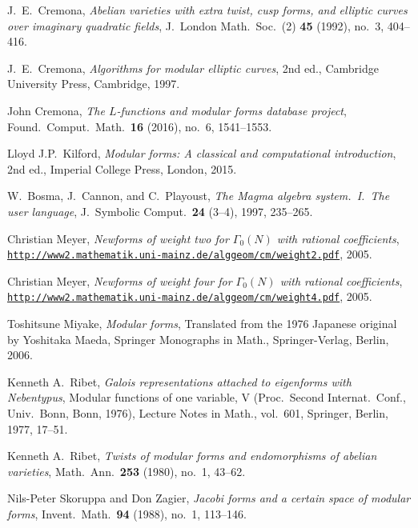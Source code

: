\documentclass[11pt]{amsart}
\numberwithin{equation}{subsection}
\theoremstyle{plain}
\theoremstyle{definition}
\begin{document}
\begin{thebibliography}{999}

J.\ E.\ Cremona, \emph{Abelian varieties with extra twist, cusp forms, and elliptic curves over imaginary quadratic fields}, J.\ London Math.\ Soc.\ (2) \textbf{45} (1992), no.\ 3, 404--416.

J.\ E.\ Cremona, \emph{Algorithms for modular elliptic curves}, 2nd ed., Cambridge University Press, Cambridge, 1997.

John Cremona, \emph{The $L$-functions and modular forms database project}, Found.\ Comput.\ Math.\ \textbf{16} (2016), no.\ 6, 1541--1553.

Lloyd J.P.\ Kilford, \emph{Modular forms: A classical and computational introduction}, 2nd ed., Imperial College Press, London, 2015.

W.~Bosma, J.~Cannon, and C.~Playoust, \emph{The Magma algebra system.\ I.\ The user language}, J.\ Symbolic Comput.\ \textbf{24} (3--4), 1997, 235--265.

Christian Meyer, \emph{Newforms of weight two for $\Gamma_0(N)$ with rational coefficients}, \\ \href{http://www2.mathematik.uni-mainz.de/alggeom/cm/weight2.pdf}{\texttt{http://www2.mathematik.uni-mainz.de/alggeom/cm/weight2.pdf}}, 2005.

Christian Meyer, \emph{Newforms of weight four for $\Gamma_0(N)$ with rational coefficients}, \\ \href{http://www2.mathematik.uni-mainz.de/alggeom/cm/weight4.pdf}{\texttt{http://www2.mathematik.uni-mainz.de/alggeom/cm/weight4.pdf}}, 2005.

Toshitsune Miyake, \emph{Modular forms}, Translated from the 1976 Japanese original by Yoshitaka Maeda, Springer Monographs in Math., Springer-Verlag, Berlin, 2006.

Kenneth A.\ Ribet, \emph{Galois representations attached to eigenforms with Nebentypus}, Modular functions of one variable, V (Proc.\ Second Internat.\ Conf., Univ.\ Bonn, Bonn, 1976), Lecture Notes in Math., vol.\ 601, Springer, Berlin, 1977, 17--51.

Kenneth A.\ Ribet, \emph{Twists of modular forms and endomorphisms of abelian varieties}, Math.\ Ann.\ \textbf{253} (1980), no.\ 1, 43--62.

Nils-Peter Skoruppa and Don Zagier, \emph{Jacobi forms and a certain space of modular forms}, Invent.\ Math.\ \textbf{94} (1988), no.\ 1, 113--146.


\end{thebibliography}
\end{document}
